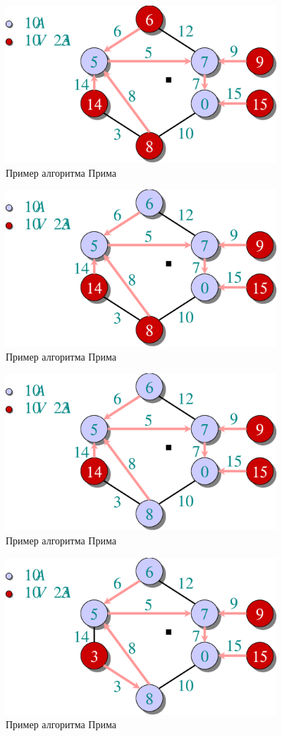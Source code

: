\documentclass[a4paper,11pt]{article}
\begin{document}
\begin{figure}[ht]
  \centering
  \includegraphics[width=4in]{lecture16/prim7.eps}
  \caption{Пример алгоритма Прима}
\end{figure}
\begin{figure}[ht]
  \centering
  \includegraphics[width=4in]{lecture16/prim8.eps}
  \caption{Пример алгоритма Прима}
\end{figure}
\begin{figure}[ht]
  \centering
  \includegraphics[width=4in]{lecture16/prim9.eps}
  \caption{Пример алгоритма Прима}
\end{figure}
\begin{figure}[ht]
  \centering
  \includegraphics[width=4in]{lecture16/prim10.eps}
  \caption{Пример алгоритма Прима}
\end{figure}
\end{document}
